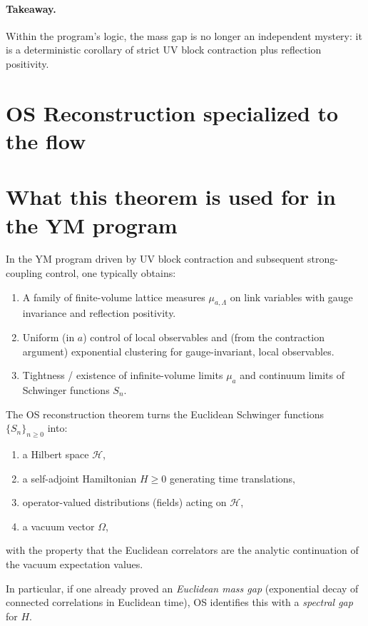 \documentclass[11pt]{article}
\theoremstyle{definition}
\newcommand{\1}{\mathbf{1}}
\newcommand{\cH}{\mathcal{H}}
\begin{document}
\paragraph{Takeaway.}
Within the program's logic, the mass gap is no longer an independent mystery: it is a deterministic corollary of strict UV block contraction plus reflection positivity.

\section{OS Reconstruction specialized to the flow}\label{sec:os}
\section{What this theorem is used for in the YM program}

In the YM program driven by UV block contraction and subsequent strong-coupling control, one typically obtains:
\begin{enumerate}[label=(\alph*)]
\item A family of finite-volume lattice measures \(\mu_{a,\Lambda}\) on link variables with gauge invariance and reflection positivity.
\item Uniform (in \(a\)) control of local observables and (from the contraction argument) exponential clustering for gauge-invariant, local observables.
\item Tightness / existence of infinite-volume limits \(\mu_a\) and continuum limits of Schwinger functions \(S_n\).
\end{enumerate}

The OS reconstruction theorem turns the Euclidean Schwinger functions \(\{S_n\}_{n\ge 0}\) into:
\begin{enumerate}[label=(\roman*)]
\item a Hilbert space \(\cH\),
\item a self-adjoint Hamiltonian \(H\ge 0\) generating time translations,
\item operator-valued distributions (fields) acting on \(\cH\),
\item a vacuum vector \(\Omega\),
\end{enumerate}
with the property that the Euclidean correlators are the analytic continuation of the vacuum expectation values.

In particular, if one already proved an \emph{Euclidean mass gap} (exponential decay of connected correlations in Euclidean time), OS identifies this with a \emph{spectral gap} for \(H\).
\end{document}
